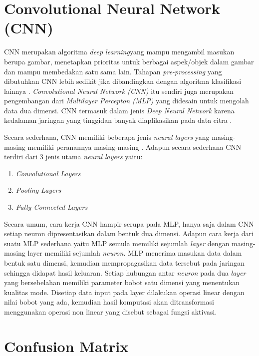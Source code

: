 \section{Convolutional Neural Network (CNN)}
\label{sec:convolutionalneuralnetwork}
CNN merupakan algoritma \textit{deep learning}yang mampu mengambil masukan berupa gambar, menetapkan prioritas untuk berbagai aspek/objek dalam gambar dan mampu membedakan satu sama lain. Tahapan \textit{pre-processing} yang dibutuhkan CNN lebih sedikit jika dibandingkan dengan algoritma klasifikasi lainnya \citep*{towardsDS}. \textit{Convolutional Neural Network (CNN)} itu sendiri juga merupakan pengembangan dari \textit{Multilayer Percepton (MLP)} yang didesain untuk mengolah data dua dimensi. CNN termasuk dalam jenis \textit{Deep Neural Network} karena kedalaman jaringan yang tinggidan banyak diaplikasikan pada data citra \citep*{putra2016klasifikasi}.\par
Secara sederhana, CNN memiliki beberapa jenis \textit{neural layers} yang masing-masing memiliki peranannya masing-masing \citep*{voulodimos2018deep}. Adapun secara sederhana CNN terdiri dari 3 jenis utama \textit{neural layers} yaitu: \par
\begin{enumerate}[nolistsep]
    \item \textit{Convolutional Layers}
    \item \textit{Pooling Layers}
    \item \textit{Fully Connected Layers}
\end{enumerate}
\indent Secara umum, cara kerja CNN hampir serupa pada MLP, hanya saja dalam CNN setiap neuron dipresentasikan dalam bentuk dua dimensi. Adapun cara kerja dari suatu MLP sederhana yaitu MLP semula memiliki sejumlah \textit{layer} dengan masing-masing layer memiliki sejumlah \textit{neuron}. MLP menerima masukan data dalam bentuk satu dimensi, kemudian mempropagasikan data tersebut pada jaringan sehingga didapat hasil keluaran. Setiap hubungan antar \textit{neuron} pada dua \textit{layer} yang bersebelahan memiliki parameter bobot satu dimensi yang menentukan kualitas mode. Disetiap data input pada layer dilakukan operasi linear dengan nilai bobot yang ada, kemudian hasil komputasi akan ditransformasi menggunakan operasi non linear yang disebut sebagai fungsi aktivasi. \par


\section{Confusion Matrix}
\label{sec:confusionmatrix}

